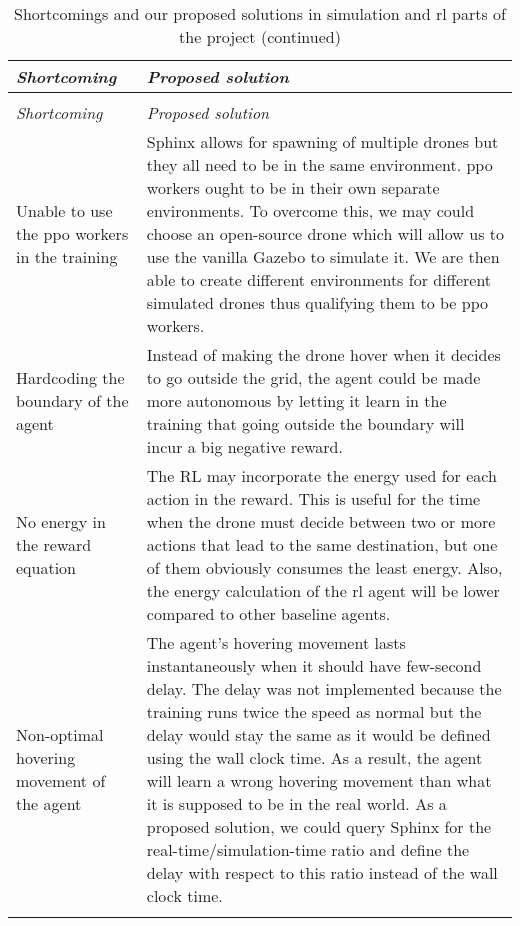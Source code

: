 \documentclass[../main.tex]{subfiles}
\begin{document}
\begin{center}
    \begin{xltabular}{\textwidth}{ X X }
        \caption{Shortcomings and our proposed solutions in simulation
        and \gls{rl} parts of the project.}
        \label{tab:shortcomings} \\
        \toprule
        \textit{Shortcoming} 
            & \textit{Proposed solution} \\

        \midrule
        \endfirsthead
        \caption[]{Shortcomings and our proposed solutions in simulation
        and \gls{rl} parts of the project (continued)}\\
        \toprule
        \textit{Shortcoming} 
            & \textit{Proposed solution} \\

        \midrule
        \endhead
        
        Unable to use the \gls{ppo} workers in the training            
        & 
        Sphinx allows for spawning of multiple drones but they all
        need to be in the same environment. 
        \gls{ppo} workers ought to be in their own separate
        environments.
        To overcome this, we may could choose an open-source drone
        which will allow us to use the vanilla Gazebo to simulate it.
        We are then able to create different environments for
        different simulated drones thus qualifying them to be
        \gls{ppo} workers.
        \\ \addlinespace

        Hardcoding the boundary of the agent
        &
        Instead of making the drone hover when it decides to go
        outside the grid, the agent could be made more autonomous by
        letting it learn in the training that going outside the
        boundary will incur a big negative reward.
        \\ \addlinespace

        No energy in the reward equation
        &
        The RL may incorporate the energy used for each action in the
        reward. This is useful for the time when the drone must decide
        between two or more actions that lead to the same destination,
        but one of them obviously consumes the least energy.
        Also, the energy calculation of the \gls{rl} agent will be
        lower compared to other baseline agents.
        \\ \addlinespace

        Non-optimal hovering movement of the agent
        &
        The agent's hovering movement lasts instantaneously when it
        should have few-second delay.
        The delay was not implemented because the training runs twice
        the speed as normal but the delay would stay the same as it
        would be defined using the wall clock time.
        As a result, the agent will learn a wrong hovering movement
        than what it is supposed to be in the real world.
        As a proposed solution, we could query Sphinx for the
        real-time/simulation-time ratio and define the delay with
        respect to this ratio instead of the wall clock time.
        \\ \addlinespace


\end{xltabular}
\end{center}
\end{document}
